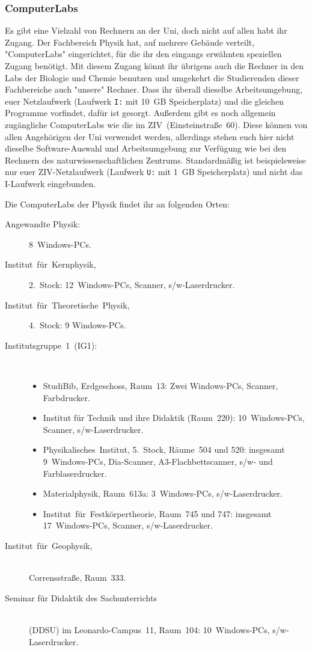 \begin{multicols}{2}
\subsubsection*{ComputerLabs}
Es gibt eine Vielzahl von Rechnern an der Uni, doch nicht auf allen habt ihr Zugang. Der Fachbereich Physik hat, auf mehrere Gebäude verteilt, "ComputerLabs" eingerichtet, für die ihr den eingangs erwähnten speziellen Zugang benötigt. Mit diesem Zugang könnt ihr übrigens auch die Rechner in den Labs der Biologie und Chemie benutzen und umgekehrt die Studierenden dieser Fachbereiche auch "unsere" Rechner. Dass ihr überall dieselbe Arbeitsumgebung, euer Netzlaufwerk (Laufwerk \texttt{I:} mit \SI{10}{GB} Speicherplatz) und die gleichen Programme vorfindet, dafür ist gesorgt. Außerdem gibt es noch allgemein zugängliche ComputerLabs wie die im ZIV~(Einsteinstraße~60). Diese können von allen Angehörigen der Uni verwendet werden, allerdings stehen euch hier nicht dieselbe Software-Auswahl und Arbeitsumgebung zur Verfügung wie bei den Rechnern des naturwissenschaftlichen Zentrums. Standardmäßig ist beispielsweise nur euer ZIV-Netzlaufwerk (Laufwerk \texttt{U:} mit \SI{1}{GB} Speicherplatz) und nicht das I-Laufwerk eingebunden.

Die ComputerLabs der Physik findet ihr an folgenden Orten:
\begin{description}
\item[Angewandte Physik:] 8~Windows-PCs.
\item[Institut~für~Kernphysik,] 2.~Stock: 12~Windows-PCs, Scanner, s/w-Laserdrucker.
\item[Institut~für~Theoretische~Physik,] 4.~Stock: 9 Windows-PCs.
\item[Institutsgruppe~1~(IG1):]~\par
	\begin{itemize}[leftmargin=0.2cm]
	\item StudiBib, Erdgeschoss, Raum~13: Zwei Windows-PCs, Scanner, Farbdrucker.
	\item Institut für Technik und ihre Didaktik (Raum~220): 10~Windows-PCs, Scanner, s/w-Laserdrucker.
	\item Physikalisches~Institut, 5.~Stock, Räume~504 und 520: insgesamt 9~Windows-PCs, Dia-Scanner, A3-Flachbettscanner, s/w- und Farblaserdrucker.
	\item Materialphysik, Raum~613a: 3~Windows-PCs, s/w-Laserdrucker.
	\item Institut~für~Festkörpertheorie, Raum~745 und 747: insgesamt 17~Windows-PCs, Scanner, s/w-Laserdrucker.
	\end{itemize}
\item[Institut~für~Geophysik,]~\\Corrensstraße, Raum~333.
\item[Seminar für Didaktik des Sachunterrichts]~\\(DDSU) im Leonardo-Campus~11, Raum~104: 10~Windows-PCs, s/w-Laserdrucker.
\end{description}


\end{multicols}
